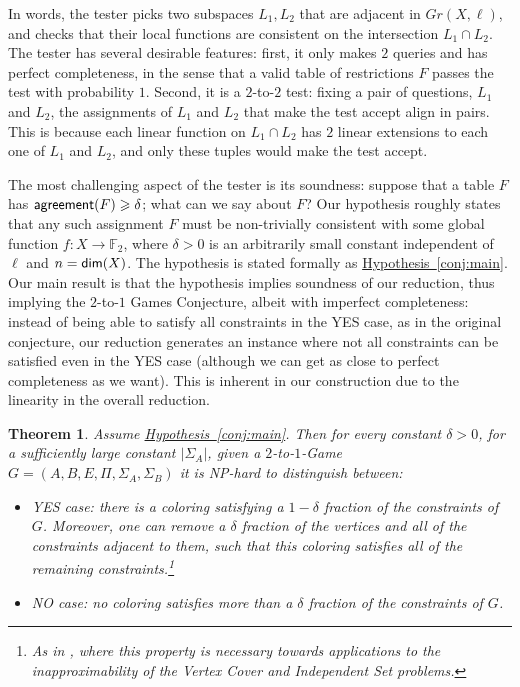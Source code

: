 \documentclass[11pt]{article}
\numberwithin{equation}{section}
\newtheorem{theorem}{Theorem}[section]
\theoremstyle{definition}
\theoremstyle{plain}
\newcommand{\expref}[2]{\hyperref[#2]{#1~\ref{#2}}}
\newcommand*\dimm{{\sf dim}}
\renewcommand\geq{\geqslant}
\def\F{\mathbb{F}}
\def\agr{{\sf agreement}}
\begin{document}
In words, the tester picks two subspaces $L_1,L_2$ that are adjacent in $Gr(X,\ell)$, and checks that their local functions are consistent
on the intersection $L_1\cap L_2$. The tester has several desirable features: first, it only makes $2$ queries and has perfect
completeness, in the sense that a valid table of restrictions $F$ passes the test with probability $1$. Second, it is a $2$-to-$2$
test: fixing a pair of questions,  %
$L_1$ and $L_2$, the assignments of $L_1$ and $L_2$ that make the test accept align in pairs. This is
because each linear function on $L_1\cap L_2$ has $2$ linear extensions to each one of $L_1$ and $L_2$, and only these tuples would make
the test accept.

The most challenging aspect of the tester is its soundness: suppose that a table $F$ has $\agr(F)\geq \delta$; what can we
say about $F$? Our hypothesis roughly states that any such assignment $F$ must be non-trivially consistent with some global
function $f:X\to\F_2$, where $\delta>0$ is an arbitrarily small
constant independent of $\ell$ and $n=\dimm(X)$.  The hypothesis is
stated formally as \expref{Hypothesis}{conj:main}. Our main result is that
the hypothesis implies soundness of our reduction, thus implying the
$2$-to-$1$ Games Conjecture, albeit with imperfect completeness:
instead of being able to satisfy all constraints in the YES case, as
in the original conjecture, our reduction generates an instance where
not all constraints can be satisfied even in the YES case (although we
can get as close to perfect completeness as we want). This
is inherent in our construction due to the linearity in the overall reduction.


\begin{theorem} \label{thm:main-result}
Assume \expref{Hypothesis}{conj:main}. Then for every constant $\delta>0$, for a sufficiently large constant  $|\Sigma_A|$,
given a $2$-to-$1$-Game $G=(A,B,E,\Pi,\Sigma_A,\Sigma_B)$ it is NP-hard to distinguish between:
\begin{itemize}
\item YES case: there is a coloring satisfying
a %
$1-\delta$ fraction of the
  constraints of $G$. Moreover, one can remove a $\delta$ fraction of the
  vertices and all of the constraints adjacent to them, such that this coloring
  satisfies all of the remaining constraints.\footnote{As in \cite{KMS}, where this property is necessary towards applications to the inapproximability of the Vertex Cover and Independent Set problems. }

\item NO case: no coloring satisfies more than
a %
$\delta$ fraction of the constraints of $G$.
\end{itemize}
\end{theorem}
\end{document}
